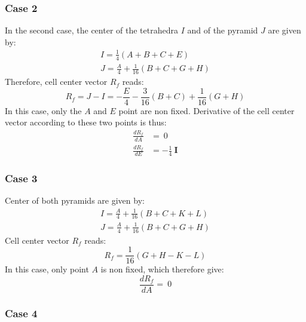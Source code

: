 \documentclass[11pt]{article}
\begin{document}
\subsubsection{Case 2}

In the second case, the center of the tetrahedra $I$ and of the pyramid $J$ are given by:
\begin{subequations}
\begin{gather}
I = \frac{1}{4} (A + B + C + E) \\
J = \frac{A}{4} + \frac{1}{16} (B + C + G + H)
\end{gather}
\end{subequations} 
Therefore, cell center vector $R_f$ reads:
\begin{equation}
R_f = J-I = -\frac{E}{4} - \frac{3}{16} (B + C) + \frac{1}{16} ( G + H)
\end{equation}
In this case, only the $A$ and $E$ point are non fixed. Derivative of the cell center vector according to these two points is thus:
\begin{subequations}
\begin{align}
\frac{d R_f}{d A} &= \ 0 \\
\frac{d R_f}{d E} &= - \frac{1}{4}\ \boldsymbol{I}
\end{align}
\end{subequations}


\subsubsection{Case 3}

Center of both pyramids are given by:
\begin{subequations}
\begin{gather}
I = \frac{A}{4} + \frac{1}{16} (B + C + K + L) \\
J = \frac{A}{4} + \frac{1}{16} (B + C + G + H)
\end{gather}
\end{subequations} 
Cell center vector $R_f$ reads:
\begin{equation}
R_f = \frac{1}{16} ( G + H - K - L)
\end{equation}
In this case, only point $A$ is non fixed, which therefore give:
\begin{equation}
\frac{d R_f}{d A} = \ 0 
\end{equation}


\subsubsection{Case 4}
\end{document}
